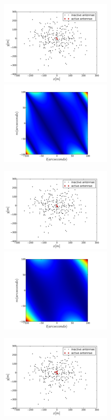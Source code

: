 \documentclass[11pt,letterpaper]{article}
\begin{document}
\begin{figure}[!h]
\centerline{
\includegraphics[width=0.5\textwidth]{2_closestantennae.pdf}
\includegraphics[width=0.5\textwidth]{DFT_image_2closest.pdf}
}
\centerline{
\includegraphics[width=0.5\textwidth]{4_closestantennae.pdf}
\includegraphics[width=0.5\textwidth]{DFT_image_4closest.pdf}
}
\centerline{
\includegraphics[width=0.5\textwidth]{6_closestantennae.pdf}
}
\end{figure}
\end{document}
